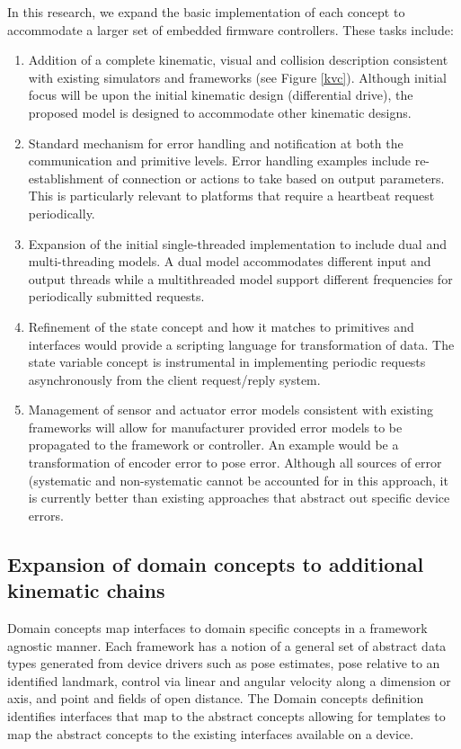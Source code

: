 In this research, we expand the basic implementation of each concept to accommodate a larger set of embedded firmware controllers.  These tasks include: 
\begin{enumerate}
\item Addition of a complete kinematic, visual and collision description consistent with existing simulators and frameworks (see Figure \ref{kvc}).  Although initial focus will be upon the initial kinematic design (differential drive), the proposed model is designed to accommodate other kinematic designs.
\item Standard mechanism for error handling and notification at both the communication and primitive levels.  Error handling examples include re-establishment of connection or actions to take based on output parameters.  This is particularly relevant to platforms that require a heartbeat request periodically.
\item Expansion of the initial single-threaded implementation to include dual and multi-threading models.  A dual model accommodates different input and output threads while a multithreaded model support different frequencies for periodically submitted requests. 
\item Refinement of the state concept and how it matches to primitives and interfaces would provide a scripting language for transformation of data.  The state variable concept is instrumental in implementing periodic requests asynchronously from the client request/reply system.
\item Management of sensor and actuator error models consistent with existing frameworks will allow for manufacturer provided error models to be propagated to the framework or controller.  An example would be a transformation of encoder error to pose error.  Although all sources of error (systematic and non-systematic cannot be accounted for in this approach, it is currently better than existing approaches that abstract out specific device errors.
\end{enumerate}


\subsection{Expansion of domain concepts to additional kinematic chains}
Domain concepts map interfaces to domain specific concepts in a framework agnostic manner.  Each framework has a notion of a general set of abstract data types generated from device drivers such as pose estimates, pose relative to an identified landmark, control via linear and angular velocity along a dimension or axis, and point and fields of open distance.  The {\sc Domain concepts} definition identifies interfaces that map to the abstract concepts allowing for templates to map the abstract concepts to the existing interfaces available on a device.

